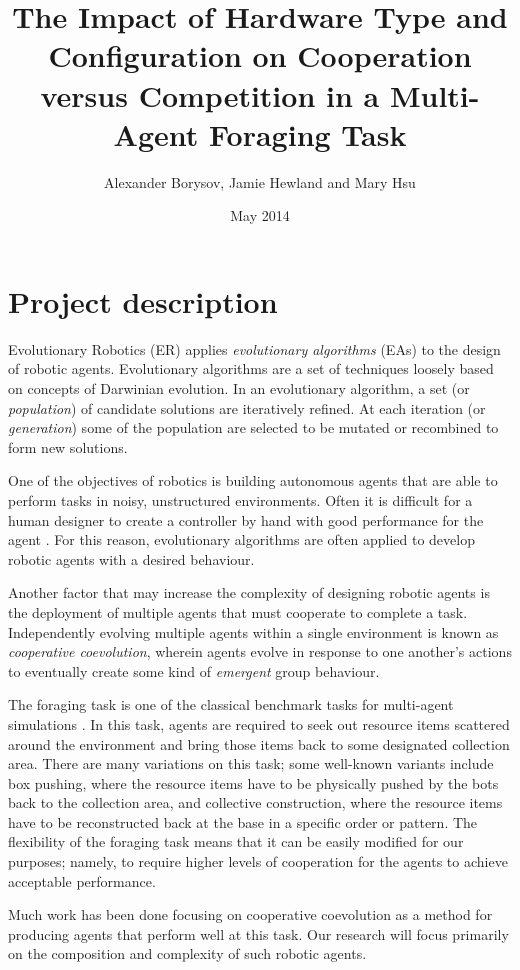 \documentclass[a4paper,12pt]{article}
\title{The Impact of Hardware Type and Configuration on Cooperation versus Competition in a Multi-Agent Foraging Task}
\author{Alexander Borysov, Jamie Hewland and Mary Hsu}
\date{May 2014}
\begin{document}
\maketitle

\section{Project description}
Evolutionary Robotics (ER) applies \emph{evolutionary algorithms} (EAs) to the design of robotic agents. Evolutionary algorithms are a set of techniques loosely based on concepts of Darwinian evolution. In an evolutionary algorithm, a set (or \emph{population}) of candidate solutions are iteratively refined. At each iteration (or \emph{generation}) some of the population are selected to be mutated or recombined to form new solutions.

One of the objectives of robotics is building autonomous agents that are able to perform tasks in noisy, unstructured environments. Often it is difficult for a human designer to create a controller by hand with good performance for the agent \cite{Nolfi94}. For this reason, evolutionary algorithms are often applied to develop robotic agents with a desired behaviour.

Another factor that may increase the complexity of designing robotic agents is the deployment of multiple agents that must cooperate to complete a task. Independently evolving multiple agents within a single environment is known as \emph{cooperative coevolution}, wherein agents evolve in response to one another’s actions to eventually create some kind of \emph{emergent} group behaviour.

The foraging task is one of the classical benchmark tasks for multi-agent simulations \cite{Ostergaard01}. In this task, agents are required to seek out resource items scattered around the environment and bring those items back to some designated collection area. There are many variations on this task; some well-known variants include box pushing, where the resource items have to be physically pushed by the bots back to the collection area, and collective construction, where the resource items have to be reconstructed back at the base in a specific order or pattern. The flexibility of the foraging task means that it can be easily modified for our purposes; namely, to require higher levels of cooperation for the agents to achieve acceptable performance.

Much work has been done focusing on cooperative coevolution as a method for producing agents that perform well at this task. Our research will focus primarily on the composition and complexity of such robotic agents.
\end{document}

